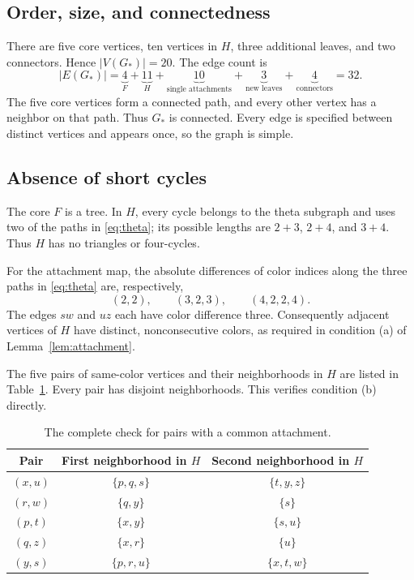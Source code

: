 \documentclass[11pt,a4paper]{article}
\theoremstyle{definition}
\theoremstyle{remark}
\newcommand{\Gstar}{G_{\ast}}
\begin{document}
\subsection{Order, size, and connectedness}

There are five core vertices, ten vertices in $H$, three additional
leaves, and two connectors. Hence $|V(\Gstar)|=20$.
The edge count is
\begin{equation}\label{eq:sizegraph}
 |E(\Gstar)|=
 \underbrace{4}_{F}+
 \underbrace{11}_{H}+
 \underbrace{10}_{\text{single attachments}}+
 \underbrace{3}_{\text{new leaves}}+
 \underbrace{4}_{\text{connectors}}
 =32.
\end{equation}
The five core vertices form a connected path, and every other vertex
has a neighbor on that path. Thus $\Gstar$ is connected.
Every edge is specified between distinct vertices and appears once,
so the graph is simple.

\subsection{Absence of short cycles}

The core $F$ is a tree. In $H$, every cycle belongs to the theta
subgraph and uses two of the paths in \eqref{eq:theta}; its possible
lengths are $2+3$, $2+4$, and $3+4$. Thus $H$ has no triangles
or four-cycles.

For the attachment map, the absolute differences of color indices
along the three paths in \eqref{eq:theta} are, respectively,
\[
                 (2,2),\qquad (3,2,3),\qquad (4,2,2,4).
\]
The edges $sw$ and $uz$ each have color difference three.
Consequently adjacent vertices of $H$ have distinct,
nonconsecutive colors, as required in condition (a) of
Lemma~\ref{lem:attachment}.

The five pairs of same-color vertices and their neighborhoods in
$H$ are listed in Table~\ref{tab:neighborhoods}. Every pair has
disjoint neighborhoods. This verifies condition (b) directly.

\begin{table}[htbp]
\centering
\caption{The complete check for pairs with a common attachment.}
\label{tab:neighborhoods}
\begin{tabular}{@{}ccc@{}}
\toprule
Pair & First neighborhood in $H$ & Second neighborhood in $H$\\
\midrule
$(x,u)$ & $\{p,q,s\}$ & $\{t,y,z\}$\\
$(r,w)$ & $\{q,y\}$ & $\{s\}$\\
$(p,t)$ & $\{x,y\}$ & $\{s,u\}$\\
$(q,z)$ & $\{x,r\}$ & $\{u\}$\\
$(y,s)$ & $\{p,r,u\}$ & $\{x,t,w\}$\\
\bottomrule
\end{tabular}
\end{table}
\end{document}
